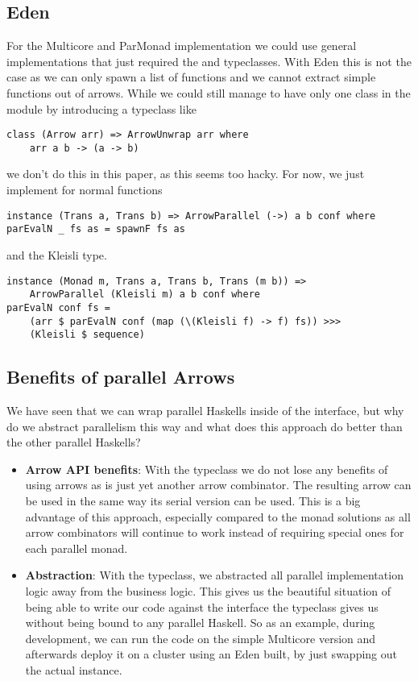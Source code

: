 \subsection{Eden}
For the Multicore and ParMonad implementation we could use general implementations that just required the  and  typeclasses. With Eden this is not the case as we can only spawn a list of functions and we cannot extract simple functions out of arrows. While we could still manage to have only one class in the module by introducing a typeclass like
\begin{lstlisting}[frame=htrbl]
class (Arrow arr) => ArrowUnwrap arr where
	arr a b -> (a -> b)
\end{lstlisting}
we don't do this in this paper, as this seems too hacky. For now, we just implement  for normal functions
\begin{lstlisting}[frame=htrbl]
instance (Trans a, Trans b) => ArrowParallel (->) a b conf where
parEvalN _ fs as = spawnF fs as
\end{lstlisting}
and the Kleisli type.
\begin{lstlisting}[frame=htrbl]
instance (Monad m, Trans a, Trans b, Trans (m b)) =>
	ArrowParallel (Kleisli m) a b conf where
parEvalN conf fs =
	(arr $ parEvalN conf (map (\(Kleisli f) -> f) fs)) >>>
	(Kleisli $ sequence)
\end{lstlisting}

\subsection{Benefits of parallel Arrows}
We have seen that we can wrap parallel Haskells inside of the  interface, but why do we abstract parallelism this way and what does this approach do better than the other parallel Haskells?
\begin{itemize}
	\item \textbf{Arrow API benefits}:
	With the  typeclass we do not lose any benefits of using arrows as  is just yet another arrow combinator. The resulting arrow can be used in the same way its serial version can be used. This is a big advantage of this approach, especially compared to the monad solutions as all arrow combinators will continue to work instead of requiring special ones for each parallel monad.
	\item \textbf{Abstraction}:
	With the  typeclass, we abstracted all parallel implementation logic away from the business logic. This gives us the beautiful situation of being able to write our code against the interface the typeclass gives us without being bound to any parallel Haskell. So as an example, during development, we can run the code on the simple Multicore version and afterwards deploy it on a cluster using an Eden built, by just swapping out the actual  instance.
\end{itemize}

